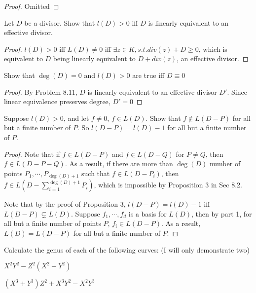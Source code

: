 \documentclass{solution}
\begin{document}
\begin{proof}
    Omitted
\end{proof}

\begin{problem}{8.11}
    Let $D$ be a divisor. Show that $l(D) \gt 0$ iff $D$ is linearly equivalent to an effective divisor.
\end{problem}

\begin{proof}
    $l(D) \gt 0$ iff $L(D) \ne 0$ iff $\exists z \in K, s.t. div(z) + D \ge 0$, which is equivalent to $D$ being linearly equivalent to $D + div(z)$, an effective divisor.
\end{proof}

\begin{problem}{8.12}
    Show that $\deg(D) = 0$ and $l(D) \gt 0$ are true iff $D \equiv 0$
\end{problem}

\begin{proof}
    By Problem 8.11, $D$ is linearly equivalent to an effective divisor $D'$. Since linear equivalence preserves degree, $D' = 0$
\end{proof}

\begin{problem}{8.13}
    Suppose $l(D) \gt 0$, and let $f \ne 0$, $f \in L(D)$. Show that $f \notin L(D - P)$ for all but a finite number of $P$. So $l(D - P) = l(D) - 1$ for all but a finite number of $P$.
\end{problem}

\begin{proof}
    Note that if $f \in L(D - P)$ and $f \in L(D - Q)$ for $P \ne Q$, then $f \in L(D - P - Q)$. As a result, if there are more than $\deg (D)$ number of points $P_1, \cdots, P_{\deg(D) + 1}$ such that $f \in L(D - P_i)$, then $f \in L(D - \sum\limits_{i = 1}^{\deg(D) + 1} P_i)$, which is impossible by Proposition 3 in Sec 8.2.

    Note that by the proof of Proposition 3, $l(D - P) = l(D) - 1$ iff $L(D - P) \subsetneq L(D)$. Suppose $f_1, \cdots, f_d$ is a basis for $L(D)$, then by part 1, for all but a finite number of points $P$, $f_i \in L(D - P)$. As a result, $L(D) = L(D - P)$ for all but a finite number of $P$.
\end{proof}

\begin{problem}{8.14}
    Calculate the genus of each of the following curves: (I will only demonstrate two) \begin{inparaenum}
        \item $X^2Y^2 - Z^2(X^2 + Y^2)$
        \item $(X^3 + Y^3)Z^2 + X^3Y^2 - X^2Y^3$
    \end{inparaenum}
\end{problem}
\end{document}
